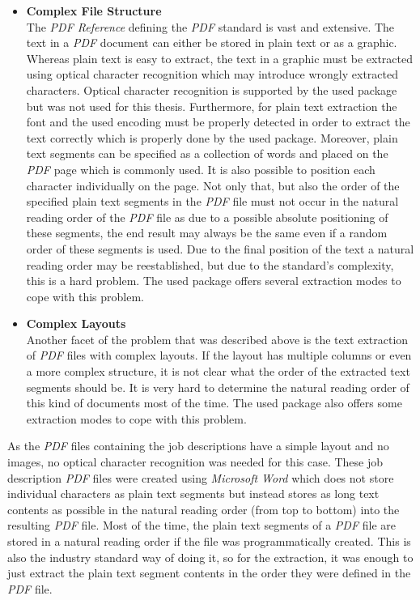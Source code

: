 \documentclass[draft,final]{thesisclass} %
\begin{document}
\begin{itemize}
    \item \textbf{Complex File Structure}\\
    The \textit{PDF Reference} defining the \textit{PDF} standard is vast and extensive. 
    The text in a \textit{PDF} document can either be stored in plain text or as a graphic.
    Whereas plain text is easy to extract, the text in a graphic must be extracted using optical character recognition which may introduce wrongly extracted characters. 
    Optical character recognition is supported by the used package but was not used for this thesis.
    Furthermore, for plain text extraction the font and the used encoding must be properly detected in order to extract the text correctly which is properly done by the used package.
    Moreover, plain text segments can be specified as a collection of words and placed on the \textit{PDF} page which is commonly used. 
    It is also possible to position each character individually on the page.
    Not only that, but also the order of the specified plain text segments in the \textit{PDF} file must not occur in the natural reading order of the \textit{PDF} file as due to a possible absolute positioning of these segments, the end result may always be the same even if a random order of these segments is used.
    Due to the final position of the text a natural reading order may be reestablished, but due to the standard's complexity, this is a hard problem. 
    The used package offers several extraction modes to cope with this problem.
    \item \textbf{Complex Layouts}\\
    Another facet of the problem that was described above is the text extraction of \textit{PDF} files with complex layouts.
    If the layout has multiple columns or even a more complex structure, it is not clear what the order of the extracted text segments should be. 
    It is very hard to determine the natural reading order of this kind of documents most of the time.
    The used package also offers some extraction modes to cope with this problem.
\end{itemize}
As the \textit{PDF} files containing the job descriptions have a simple layout and no images, no optical character recognition was needed for this case.
These job description \textit{PDF} files were created using \textit{Microsoft Word} which does not store individual characters as plain text segments but instead stores as long text contents as possible in the natural reading order (from top to bottom) into the resulting \textit{PDF} file.
Most of the time, the plain text segments of a \textit{PDF} file are stored in a natural reading order if the file was programmatically created.
This is also the industry standard way of doing it, so for the extraction, it was enough to just extract the plain text segment contents in the order they were defined in the \textit{PDF} file.
\end{document}

